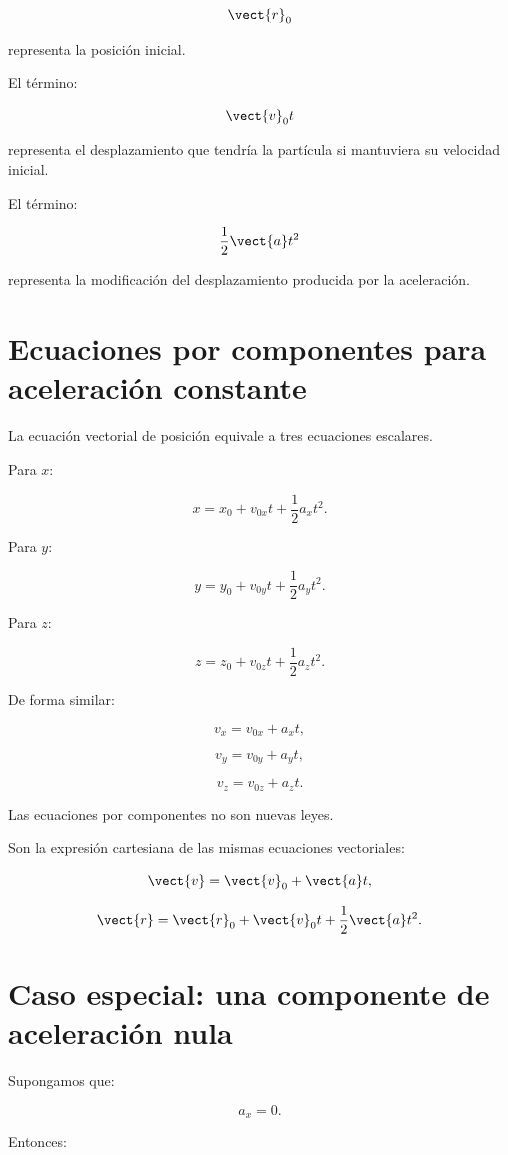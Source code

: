 \[
\vect{r}_0
\]

representa la posición inicial.

El término:

\[
\vect{v}_0t
\]

representa el desplazamiento que tendría la partícula si mantuviera su velocidad
inicial.

El término:

\[
\frac{1}{2}\vect{a}t^2
\]

representa la modificación del desplazamiento producida por la aceleración.


\section{Ecuaciones por componentes para aceleración constante}

La ecuación vectorial de posición equivale a tres ecuaciones escalares.

Para \(x\):

\[
\boxed{
x
=
x_0+v_{0x}t+\frac{1}{2}a_xt^2
}.
\]

Para \(y\):

\[
\boxed{
y
=
y_0+v_{0y}t+\frac{1}{2}a_yt^2
}.
\]

Para \(z\):

\[
\boxed{
z
=
z_0+v_{0z}t+\frac{1}{2}a_zt^2
}.
\]

De forma similar:

\[
v_x=v_{0x}+a_xt,
\]

\[
v_y=v_{0y}+a_yt,
\]

\[
v_z=v_{0z}+a_zt.
\]

\begin{idea}
Las ecuaciones por componentes no son nuevas leyes.

Son la expresión cartesiana de las mismas ecuaciones vectoriales:

\[
\vect{v}
=
\vect{v}_0+\vect{a}t,
\]

\[
\vect{r}
=
\vect{r}_0+\vect{v}_0t+\frac{1}{2}\vect{a}t^2.
\]
\end{idea}


\section{Caso especial: una componente de aceleración nula}

Supongamos que:

\[
a_x=0.
\]

Entonces:


